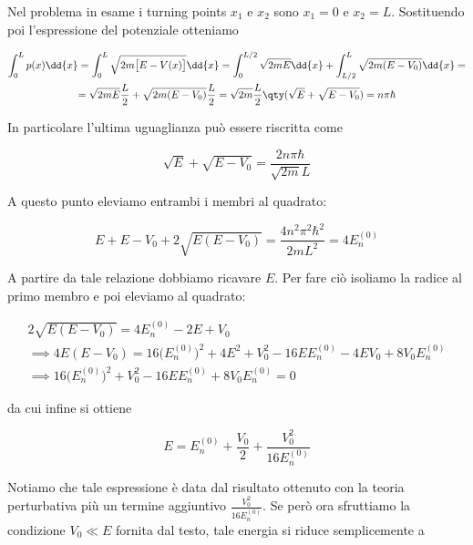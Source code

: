 \begin{soluzione}
   Nel problema in esame i turning points $x_1$ e $x_2$ sono $x_1=0$ e $x_2=L$. Sostituendo poi l'espressione del potenziale otteniamo
   
   \begin{gather*}
      \int_{0}^{L} p(x) \dd{x}
      =\int_{0}^{L} \sqrt{2m \bigl[ E - V(x) \bigr]} \dd{x}
      =\int_{0}^{L/2} \sqrt{2mE} \dd{x} + \int_{L/2}^{L} \sqrt{2m(E - V_0)} \dd{x}
      =\\
      =\sqrt{2mE} \frac{L}{2} + \sqrt{2m(E - V_0)} \frac{L}{2}
      =\sqrt{2m} \frac{L}{2} \qty( \sqrt{E} + \sqrt{E - V_0} )
      =n \pi \hbar
   \end{gather*}

   In particolare l'ultima uguaglianza può essere riscritta come

   \begin{equation*}
      \sqrt{E} + \sqrt{E - V_0}
      =\frac{2 n \pi \hbar}{\sqrt{2m} L}
   \end{equation*}

   A questo punto eleviamo entrambi i membri al quadrato:

   \begin{equation*}
      E + E - V_0 + 2\sqrt{E(E - V_0)}
      =\frac{4 n^2 \pi^2 \hbar^2}{2 m L^2}
      =4 E_n^{(0)}
   \end{equation*}

   A partire da tale relazione dobbiamo ricavare $E$. Per fare ciò isoliamo la radice al primo membro e poi eleviamo al quadrato:

   \begin{gather*}
      2\sqrt{E(E - V_0)}
      =4 E_n^{(0)} - 2E + V_0
      \\
      \implies
      4E(E - V_0)
      =16 \bigl( E_n^{(0)} \bigr)^2 + 4E^2 + V_0^2 - 16 E E_n^{(0)} - 4EV_0 + 8 V_0 E_n^{(0)}
      \\
      \implies
      16 \bigl( E_n^{(0)} \bigr)^2 + V_0^2 - 16 E E_n^{(0)} + 8 V_0 E_n^{(0)}=0
   \end{gather*}

   da cui infine si ottiene

   \begin{equation*}
      E=E_n^{(0)} + \frac{V_0}{2} + \frac{V_0^2}{16 E_n^{(0)}}
   \end{equation*}

   Notiamo che tale espressione è data dal risultato ottenuto con la teoria perturbativa più un termine aggiuntivo $\frac{V_0^2}{16 E_n^{(0)}}$. Se però ora sfruttiamo la condizione $V_0 \ll E$ fornita dal testo, tale energia si riduce semplicemente a


\end{soluzione}
